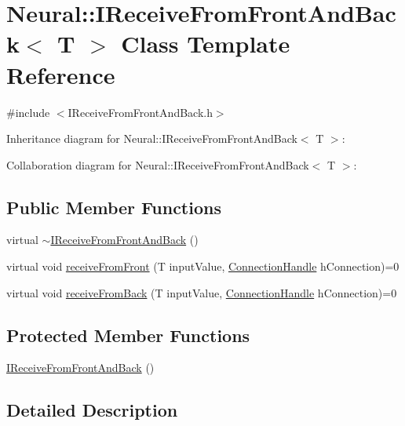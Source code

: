 \hypertarget{class_neural_1_1_i_receive_from_front_and_back}{
\section{Neural::IReceiveFromFrontAndBack$<$ T $>$ Class Template Reference}
\label{class_neural_1_1_i_receive_from_front_and_back}
}


{\ttfamily \#include $<$IReceiveFromFrontAndBack.h$>$}



Inheritance diagram for Neural::IReceiveFromFrontAndBack$<$ T $>$:


Collaboration diagram for Neural::IReceiveFromFrontAndBack$<$ T $>$:
\subsection*{Public Member Functions}
\begin{DoxyCompactItemize}
\item 
virtual \hyperlink{class_neural_1_1_i_receive_from_front_and_back_a2ef8f091d92ad81346664da891ddba78}{$\sim$IReceiveFromFrontAndBack} ()
\item 
virtual void \hyperlink{class_neural_1_1_i_receive_from_front_and_back_afa3a6ff397a94056669e42184f6ada33}{receiveFromFront} (T inputValue, \hyperlink{namespace_neural_a73b2763d14999ad4308dbf4246aa503f}{ConnectionHandle} hConnection)=0
\item 
virtual void \hyperlink{class_neural_1_1_i_receive_from_front_and_back_ae1f573476636f59aea5c862eb58479e5}{receiveFromBack} (T inputValue, \hyperlink{namespace_neural_a73b2763d14999ad4308dbf4246aa503f}{ConnectionHandle} hConnection)=0
\end{DoxyCompactItemize}
\subsection*{Protected Member Functions}
\begin{DoxyCompactItemize}
\item 
\hyperlink{class_neural_1_1_i_receive_from_front_and_back_a9bfea87122b8b5dc93ac720a291e36ee}{IReceiveFromFrontAndBack} ()
\end{DoxyCompactItemize}


\subsection{Detailed Description}
